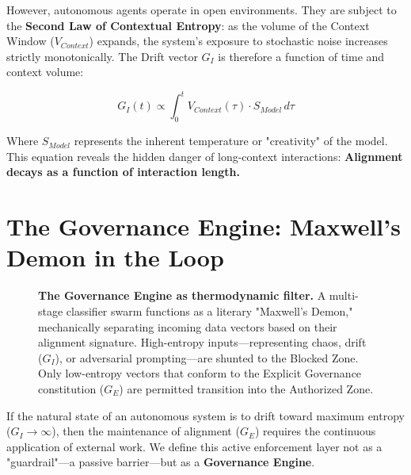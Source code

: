 \documentclass[11pt, a4paper]{article}
\newcommand{\Ge}{G_E}
\newcommand{\Gi}{G_I}
\newcommand{\Vctx}{V_{Context}}
\begin{document}
\noindent
However, autonomous agents operate in open environments. They are subject to the \textbf{Second Law of Contextual Entropy}: as the volume of the Context Window ($\Vctx$) expands, the system's exposure to stochastic noise increases strictly monotonically. The Drift vector $\Gi$ is therefore a function of time and context volume:

\begin{equation}
    \label{eq:drift_entropy}
    \Gi(t) \propto \int_{0}^{t} \Vctx(\tau) \cdot S_{Model} \, d\tau
\end{equation}

\noindent
Where $S_{Model}$ represents the inherent temperature or "creativity" of the model. This equation reveals the hidden danger of long-context interactions: \textbf{Alignment decays as a function of interaction length.}

\section{The Governance Engine: Maxwell's Demon in the Loop}
\label{sec:governance_engine}

\begin{figure}[t!]
    \centering
    \resizebox{0.95\textwidth}{!}{}
    \caption[\textbf{The Governance Engine.}]{\textbf{The Governance Engine as thermodynamic filter.} A multi-stage classifier swarm functions as a literary "Maxwell's Demon," mechanically separating incoming data vectors based on their alignment signature. High-entropy inputs---representing chaos, drift ($\Gi$), or adversarial prompting---are shunted to the Blocked Zone. Only low-entropy vectors that conform to the Explicit Governance constitution ($\Ge$) are permitted transition into the Authorized Zone.}
    \label{fig:governance_engine}
\end{figure}

If the natural state of an autonomous system is to drift toward maximum entropy ($\Gi \to \infty$), then the maintenance of alignment ($\Ge$) requires the continuous application of external work. We define this active enforcement layer not as a "guardrail"---a passive barrier---but as a \textbf{Governance Engine}.
\end{document}
